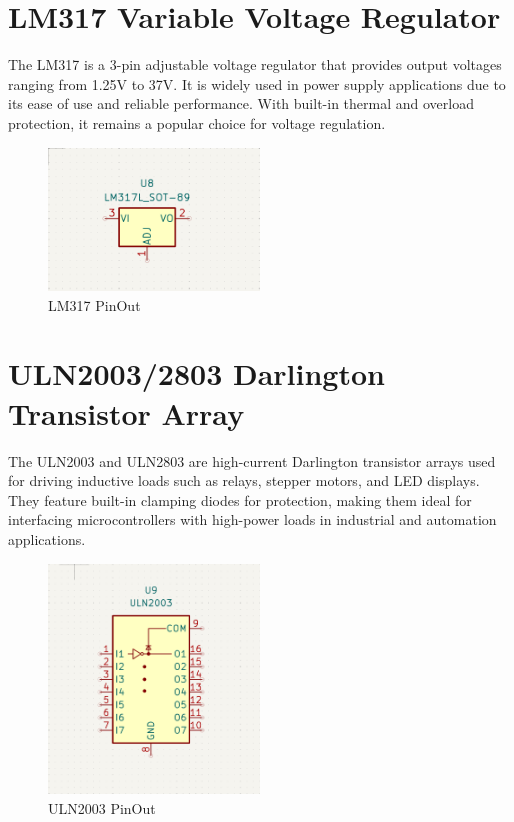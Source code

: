\documentclass{article}
\begin{document}
\section{LM317 Variable Voltage Regulator}
The LM317 is a 3-pin adjustable voltage regulator that provides output voltages ranging from 1.25V to 37V. It is widely used in power supply applications due to its ease of use and reliable performance. With built-in thermal and overload protection, it remains a popular choice for voltage regulation.
\begin{figure}[H]
    \centering
    \includegraphics[width=0.5\textwidth]{img/LM317.png}
    \caption{LM317 PinOut}
    \label{fig:LM317}
\end{figure}

\section{ULN2003/2803 Darlington Transistor Array}
The ULN2003 and ULN2803 are high-current Darlington transistor arrays used for driving inductive loads such as relays, stepper motors, and LED displays. They feature built-in clamping diodes for protection, making them ideal for interfacing microcontrollers with high-power loads in industrial and automation applications.
\begin{figure}[H]
    \centering
    \includegraphics[width=0.5\textwidth]{img/ULN2003.png}
    \caption{ULN2003 PinOut}
    \label{fig:ULN2003}
\end{figure}
\end{document}
